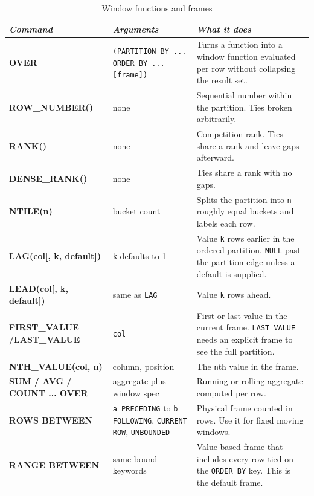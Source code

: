 \begin{table}[H]
\centering
\footnotesize
\renewcommand{\arraystretch}{1.4}
\begin{tabularx}{\textwidth}{>{\raggedright\arraybackslash}p{} >{\raggedright\arraybackslash}p{} >{\raggedright\arraybackslash}X}
\toprule
\textit{Command} & \textit{Arguments} & \textit{What it does} \\
\midrule
\textbf{OVER} & \texttt{(PARTITION BY ... ORDER BY ... [frame])} & Turns a function into a window function evaluated per row without collapsing the result set. \\
\textbf{ROW\_NUMBER()} & none & Sequential number within the partition. Ties broken arbitrarily. \\
\textbf{RANK()} & none & Competition rank. Ties share a rank and leave gaps afterward. \\
\textbf{DENSE\_RANK()} & none & Ties share a rank with no gaps. \\
\textbf{NTILE(n)} & bucket count & Splits the partition into \texttt{n} roughly equal buckets and labels each row. \\
\textbf{LAG(col[, k, default])} & \texttt{k} defaults to 1 & Value \texttt{k} rows earlier in the ordered partition. \texttt{NULL} past the partition edge unless a default is supplied. \\
\textbf{LEAD(col[, k, default])} & same as \texttt{LAG} & Value \texttt{k} rows ahead. \\
\textbf{FIRST\_VALUE /\allowbreak LAST\_VALUE} & \texttt{col} & First or last value in the current frame. \texttt{LAST\_VALUE} needs an explicit frame to see the full partition. \\
\textbf{NTH\_VALUE(col, n)} & column, position & The \texttt{n}th value in the frame. \\
\textbf{SUM / AVG / COUNT ... OVER} & aggregate plus window spec & Running or rolling aggregate computed per row. \\
\textbf{ROWS BETWEEN} & \texttt{a PRECEDING} to \texttt{b FOLLOWING}, \texttt{CURRENT ROW}, \texttt{UNBOUNDED} & Physical frame counted in rows. Use it for fixed moving windows. \\
\textbf{RANGE BETWEEN} & same bound keywords & Value-based frame that includes every row tied on the \texttt{ORDER BY} key. This is the default frame. \\
\bottomrule
\end{tabularx}
\caption*{Window functions and frames}
\end{table}

\newpage
